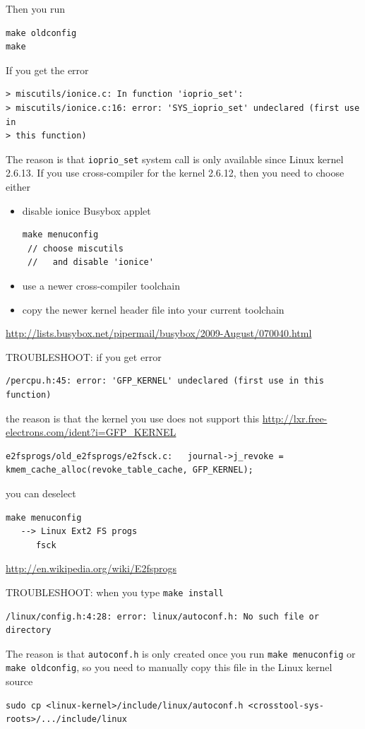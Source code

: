 Then you run
\begin{verbatim}
make oldconfig
make
\end{verbatim}

If you get the error
\begin{verbatim}
> miscutils/ionice.c: In function 'ioprio_set':
> miscutils/ionice.c:16: error: 'SYS_ioprio_set' undeclared (first use in
> this function)
\end{verbatim}
The reason is that \verb!ioprio_set! system call is only available since
Linux kernel 2.6.13. If you use cross-compiler for the kernel
2.6.12, then you need to choose either
\begin{itemize}
  \item disable ionice Busybox applet
\begin{verbatim}
make menuconfig
 // choose miscutils
 //   and disable 'ionice'
\end{verbatim}  

  \item use a newer cross-compiler toolchain

  \item copy the newer kernel header file into your current toolchain
\end{itemize}
\url{http://lists.busybox.net/pipermail/busybox/2009-August/070040.html}


TROUBLESHOOT: if you get error
\begin{verbatim}
/percpu.h:45: error: 'GFP_KERNEL' undeclared (first use in this function)
\end{verbatim}
the reason is that the kernel you use does not support this
\url{http://lxr.free-electrons.com/ident?i=GFP_KERNEL}
\begin{verbatim}
e2fsprogs/old_e2fsprogs/e2fsck.c:	journal->j_revoke = kmem_cache_alloc(revoke_table_cache, GFP_KERNEL);
\end{verbatim}
you can deselect
\begin{verbatim}
make menuconfig
   --> Linux Ext2 FS progs
      fsck
\end{verbatim}
\url{http://en.wikipedia.org/wiki/E2fsprogs}

TROUBLESHOOT: when you type \verb!make install!
\begin{verbatim}
/linux/config.h:4:28: error: linux/autoconf.h: No such file or directory
\end{verbatim}
The reason is that \verb!autoconf.h! is only created once you run
\verb!make menuconfig! or \verb!make oldconfig!, so you need
to manually copy this file in the Linux kernel source
\begin{verbatim}
sudo cp <linux-kernel>/include/linux/autoconf.h <crosstool-sys-roots>/.../include/linux
\end{verbatim}

